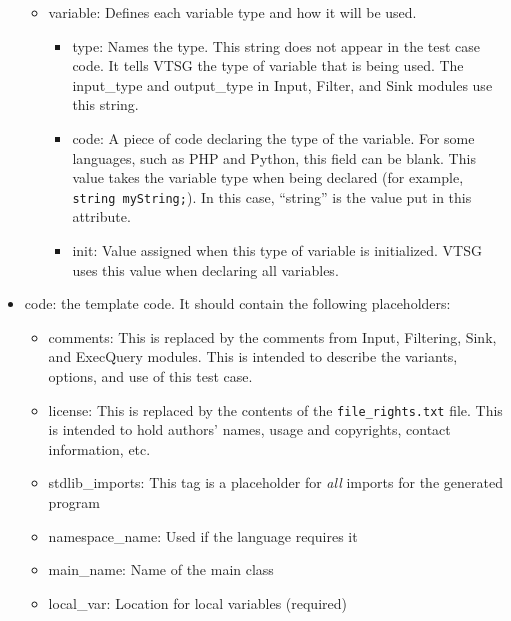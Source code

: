 \documentclass[12pt]{article}
\begin{document}
\begin{itemize}
\begin{itemize}
        \item variable: Defines each variable type and how it will 
        be used.
        \begin{itemize}
        \item type: Names the type. This string 
        does not appear in the test case code.  It tells VTSG
        the type of variable that is being used.  The input\_type
        and output\_type in Input, Filter, and Sink modules use
        this string.

        \item code: A piece of code declaring the type of the variable. For 
        some languages, such as PHP and Python, this field can be blank. 
        This value takes the variable type when being declared 
        (for example, \verb|string myString;|).  In this case, ``string''
        is the value put in this attribute.

        \item init: Value assigned when this type of variable is initialized.
        VTSG uses this value when declaring all variables.
        \end{itemize}
    \end{itemize}
    
    \item code: the template code. It should contain the 
    following placeholders:
    \begin{itemize}
        \item comments: This is replaced by the comments from Input,
        Filtering, Sink, and ExecQuery modules. This is intended to
        describe the variants, options, and use of this test case. 
        
        \item license: This is replaced by the contents of the
        \verb|file_rights.txt| file.  This is intended to hold
        authors' names, usage and copyrights, contact information, 
        etc.
        
        \item stdlib\_imports:  This tag is a placeholder for 
        \emph{all} imports for the generated program

        \item namespace\_name:  Used if the language requires it

        \item main\_name:  Name of the main class

        \item local\_var:  Location for local variables (required)


\end{itemize}
\end{itemize}
\end{document}
